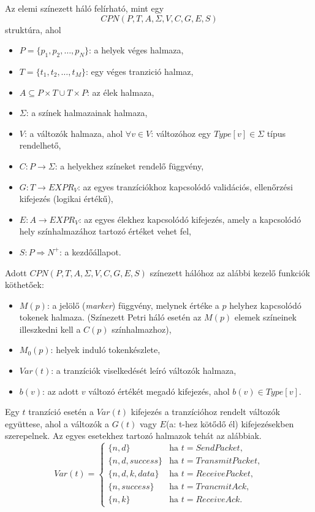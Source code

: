 Az elemi színezett háló felírható, mint egy
\[
CPN(P, T, A, \Sigma, V, C, G, E, S)
\]
struktúra, ahol 
\begin{itemize}
\item $P=\{ p_1, p_2, \ldots, p_N \}$: a helyek véges halmaza,
\item $T=\{ t_1, t_2, \ldots, t_M\}$: egy véges tranzició halmaz,
\item $A \subseteq P\times T \cup T \times P$: az élek halmaza,
\item $\Sigma$: a színek halmazainak halmaza, 
\item $V$: a változók halmaza, ahol $\forall v\in V$: változóhoz egy $Type[v] \in \Sigma $ típus rendelhető,
\item $C: P\rightarrow \Sigma$: a helyekhez színeket rendelő függvény,
\item $G: T\rightarrow EXPR_V$: az egyes tranzíciókhoz kapcsolódó validációs, ellenőrzési kifejezés (logikai értékű),
\item $E: A\rightarrow EXPR_V$: az egyes élekhez kapcsolódó kifejezés, amely a kapcsolódó hely színhalmazához tartozó értéket vehet fel,
\item $S: P\Rightarrow N^+$: a kezdőállapot.
\end{itemize}

Adott $CPN(P, T, A, \Sigma, V, C, G, E, S)$ színezett hálóhoz az alábbi kezelő funkciók köthetőek: 
\begin{itemize}
\item $M(p)$: a jelölő (\textit{marker}) függvény, melynek értéke a $p$ helyhez kapcsolódó tokenek halmaza. (Színezett Petri háló esetén az $M(p)$ elemek színeinek illeszkedni kell a $C(p)$ színhalmazhoz),
\item $M_0(p)$: helyek induló tokenkészlete,
\item $Var(t)$: a tranzíciók viselkedését leíró változók halmaza,
\item $b(v)$: az adott $v$ változó értékét megadó kifejezés, ahol $b(v) \in Type[v]$.
\end{itemize}

Egy $t$ tranzíció esetén a $Var(t)$ kifejezés a tranzícióhoz rendelt változók együttese, ahol a változók a $G(t)$ vagy $E$(a: t-hez kötődő él) kifejezésekben szerepelnek.
Az egyes esetekhez tartozó halmazok tehát az alábbiak.
\begin{equation*}
Var(t)=\begin{cases}
\{n,d\} &\text{ha } t=SendPacket, \\
\{n,d,success\} &\text{ha } t= TransmitPacket, \\
\{n,d,k,data\} &\text{ha } t=ReceivePacket, \\
\{n,success\} &\text{ha } t=TrancmitAck, \\
\{n,k\} &\text{ha }t=ReceiveAck.
\end{cases}
\end{equation*}

